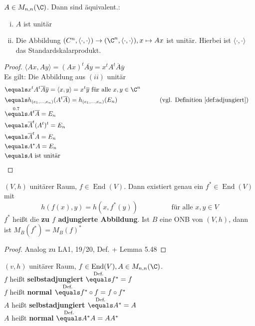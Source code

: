 \documentclass{article}
\begin{document}
    \begin{bemerkung}
        $A\in M_{n,n} (\C)$. Dann sind äquivalent.:
        \begin{enumerate}[(i)]
            \item $A$ ist unitär
            \item Die Abbildung $(C^n, \langle \cdot, \cdot\rangle) \to (\C^n, \langle \cdot, \cdot\rangle), x\mapsto Ax$ ist unitär. Hierbei ist $\langle\cdot,\cdot\rangle$ das Standardskalarprodukt.
        \end{enumerate}
    \end{bemerkung}
    \begin{proof}
        $\langle Ax, Ay\rangle = (Ax)^t\overline{Ay} = x^t A^t \overline{A}\overline{y}$\\
        Es gilt: Die Abbildung aus $(ii)$ unitär
        \begin{align*}
            &\equals x^tA^t\overline{A}\overline{y} = \langle x, y \rangle = x^t\overline{y} \text{ für alle } x, y \in \C^n\\
            &\equals h_{(e_1, \dots, e_n)}(A^t\overline{A}) = h_{(e_1, \dots, e_n)}(E_n)\hspace*{2cm}&&\text{(vgl. Definition \ref{def:adjungiert})}\\
            &\overset{0.7}{\equals} A^t\overline{A} = E_n\\
            &\equals \overline{A}^t(A^t)^t = E_n\\
            &\equals \overline{A}^tA = E_n\\
            &\equals A^* A = E_n\\
            &\equals A \text{ ist unitär}
        \end{align*}
    \end{proof}
    \begin{bemerkung}
        $(V,h)$ unitärer Raum, $f \in \operatorname{End}(V)$.
        Dann existiert genau ein $f^* \in \operatorname{End}(V)$ mit 
        $$h(f(x), y) = h(x, f^*(y))\hspace{2cm} \text{für alle $x, y\in V$}$$
        $f^*$ heißt die \textbf{zu $f$ adjungierte Abbildung}. Ist $B$ eine ONB von $(V,h)$, dann ist $M_B(f^*) = M_B(f)^*$
    \end{bemerkung}
    \begin{proof}
        Analog zu LA1, 19/20, Def. + Lemma 5.48
    \end{proof}
    \begin{definition}
        $(v,h)$ unitärer Raum, $f\in \operatorname{End}(V), A\in M_{n,n}(\C)$.\\
        $f$ heißt \textbf{selbstadjungiert} $\overset{\text{Def.}}{\equals} f^* = f$\\
        $f$ heißt \textbf{normal} $\overset{\text{Def.}}{\equals} f^*\circ f = f \circ f^*$\\
        $A$ heißt \textbf{selbstadjungiert} $\overset{\text{Def.}}{\equals} A^* = A$\\
        $A$ heißt \textbf{normal} $\overset{\text{Def.}}{\equals} A^*A = AA^*$\\
    \end{definition}
\end{document}
